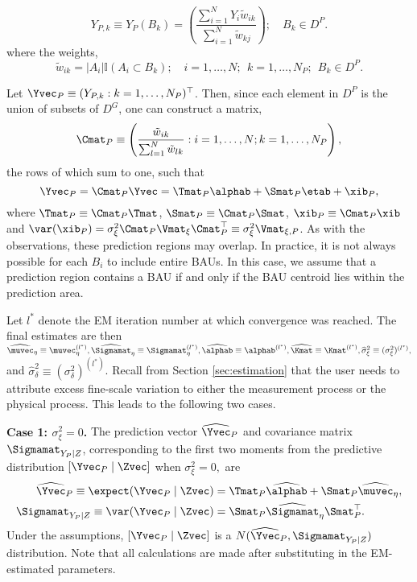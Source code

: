 \begin{equation*}
Y_{P,k} \equiv Y_{P}(B_k) = \left(\frac{\sum_{i =1}^N Y_i \tilde w_{ik}}{\sum_{i=1}^N \tilde w_{kj}}\right); \quad B_k \in D^P.
\end{equation*}
where the weights,
$$ \tilde w_{ik} = |A_i|\mathbb{I}(A_i \subset B_k); \quad i = 1,\dots,N;~~k = 1,\dots, N_P; ~~B_k \in D^P.$$

Let $\Yvec_P \equiv (Y_{P,k} : k = 1,\dots,N_P)^\top$. Then, since each element in $D^P$ is the union of subsets of $D^G$, one can construct a matrix,
\begin{equation}\label{eq:CP}
\Cmat_P \equiv \left(\frac{\tilde w_{ik}}{\sum_{l=1}^N \tilde w_{lk}} : i = 1,\dots,N; k = 1,\dots,N_P\right),
\end{equation}
the rows of which sum to one, such that
\begin{equation*}
\Yvec_P = \Cmat_P\Yvec = \Tmat_P\alphab + \Smat_P\etab + \xib_P,
\end{equation*}
where $\Tmat_P \equiv \Cmat_P \Tmat$, $\Smat_P \equiv \Cmat_P \Smat$, $\xib_P \equiv \Cmat_P \xib$ and $\var(\xib_P) = \sigma^2_\xi\Cmat_P\Vmat_\xi\Cmat_P^\top \equiv \sigma^2_\xi\Vmat_{\xi,P}$.  As with the observations, these prediction regions may overlap. In practice, it is not always possible for each $B_i$ to include entire BAUs. In this case, we assume that a prediction region contains a BAU if and only if the BAU centroid lies within the prediction area.

Let $l^*$ denote the EM iteration number at which convergence was reached. The final estimates are then $\widehat\muvec_\eta \equiv \muvec_\eta^{(l^*)}, \widehat\Sigmamat_\eta \equiv \Sigmamat_\eta^{(l^*)}, \widehat\alphab \equiv \alphab^{(l^*)}, \widehat\Kmat \equiv \Kmat^{(l^*)}, \widehat\sigma^2_\xi \equiv (\sigma^2_\xi)^{(l^*)},$ and $\widehat\sigma^2_\delta \equiv (\sigma^2_\delta)^{(l^*)}$. Recall from Section \ref{sec:estimation} that the user needs to attribute excess fine-scale variation to either the measurement process or the physical process. This leads to the following two cases.

{\bf Case 1: $\sigma^2_\xi = 0$.} The prediction vector $\widehat\Yvec_P$ and covariance matrix $\Sigmamat_{Y_P\mid Z}$, corresponding to the first two moments from the predictive distribution $[\Yvec_P \mid \Zvec]$ when $\sigma^2_\xi = 0,$ are
\begin{align*}
\widehat\Yvec_P \equiv \expect(\Yvec_P \mid \Zvec) &= \Tmat_P\widehat\alphab + \Smat_P\widehat\muvec_\eta, \\%
\Sigmamat_{Y_P \mid Z} \equiv \var(\Yvec_P\mid \Zvec) &= \Smat_P \widehat\Sigmamat_\eta\Smat_P^\top. %
\end{align*}
 Under the assumptions, $[\Yvec_P \mid \Zvec]$ is a $N(\widehat\Yvec_P,\Sigmamat_{Y_P \mid Z})$ distribution. Note that all calculations are made after substituting in the EM-estimated parameters.

